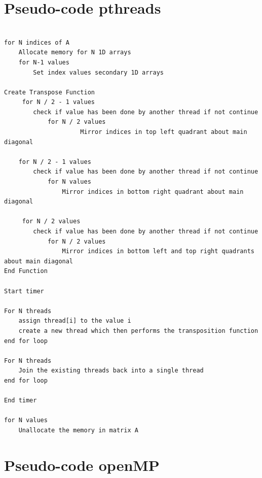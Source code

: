 \documentclass[conference]{IEEEtran}
\begin{document}
\newpage
\section{Pseudo-code pthreads}

\begin{Verbatim}

for N indices of A
    Allocate memory for N 1D arrays 
    for N-1 values
        Set index values secondary 1D arrays

Create Transpose Function
     for N / 2 - 1 values
        check if value has been done by another thread if not continue
            for N / 2 values
                     Mirror indices in top left quadrant about main diagonal

    for N / 2 - 1 values
        check if value has been done by another thread if not continue
            for N values 
                Mirror indices in bottom right quadrant about main diagonal

     for N / 2 values
        check if value has been done by another thread if not continue
            for N / 2 values 
                Mirror indices in bottom left and top right quadrants about main diagonal
End Function

Start timer

For N threads
    assign thread[i] to the value i
    create a new thread which then performs the transposition function
end for loop

For N threads
    Join the existing threads back into a single thread
end for loop

End timer

for N values    
    Unallocate the memory in matrix A

\end{Verbatim}



\newpage
\section{Pseudo-code openMP}
\end{document}
